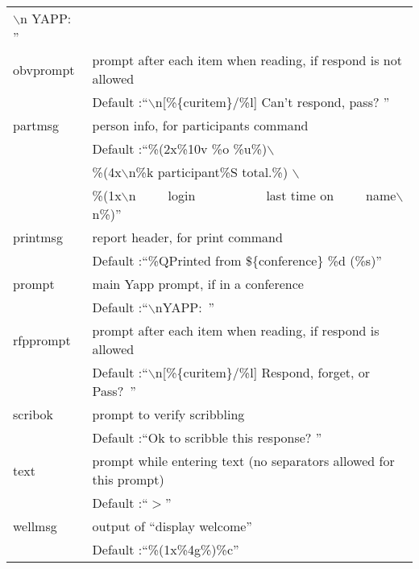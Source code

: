 \documentclass[twoside]{report}
\begin{document}
\begin{supertabular}{ll}
                 $\backslash$n YAPP: ''\\
            obvprompt &    prompt after each item when reading, if respond 
                           is not allowed\\
               & \hspace{1cm} Default :``$\backslash$n[\%\{curitem\}/\%l] 
                 Can't respond, pass? ''\\
            partmsg   &    person info, for participants command\\
               & \hspace{1cm} Default :``\%(2x\%10v \%o \%u\%)$\backslash$ \\
               & \hspace{1cm}\%(4x$\backslash$n\%k participant\%S total.\%)
                  $\backslash$ \\
               & \hspace{1cm}\%(1x$\backslash$n\ \ \ \ \ login\ \ \ \ \ \ \ \ 
                 \ \ \ last time on\ \ \ \ \ name$\backslash$n\%)'' \\
            printmsg  &    report header, for print command\\
               & \hspace{1cm} Default :``\%QPrinted from \$\{conference\} 
                 \%d (\%s)''\\
            prompt   &     main Yapp prompt, if in a conference\\
               & \hspace{1cm} Default :``$\backslash$nYAPP:\ ''\\
            rfpprompt &    prompt after each item when reading, if respond 
                 is allowed\\
               & \hspace{1cm} Default :``$\backslash$n[\%\{curitem\}/\%l] 
                 Respond, forget, or Pass?\ ''\\
            scribok   &    prompt to verify scribbling\\
               & \hspace{1cm} Default :``Ok to scribble this response? ''\\
            text     &     prompt while entering text (no separators allowed 
                           for this prompt)\\
               & \hspace{1cm} Default :``$>$''\\
            wellmsg  &     output of ``display welcome''\\
               & \hspace{1cm} Default :``\%(1x\%4g\%)\%c''\\
         \end{supertabular}   
\vspace{12pt}
\end{document}
